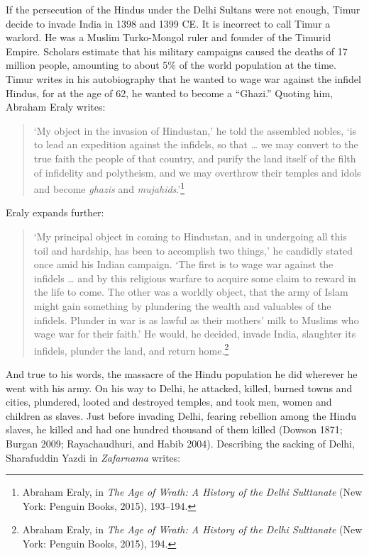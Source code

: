 If the persecution of the Hindus under the Delhi Sultans were not enough, Timur decide to invade India in 1398 and 1399 CE. It is incorrect to call Timur a warlord. He was a Muslim Turko-Mongol ruler and founder of the Timurid Empire. Scholars estimate that his military campaigns caused the deaths of 17 million people, amounting to about 5\% of the world population at the time. Timur writes in his autobiography that he wanted to wage war against the infidel Hindus, for at the age of 62, he wanted to become a “Ghazi.” Quoting him, Abraham Eraly writes: 
\begin{quote}
‘My object in the invasion of Hindustan,’ he told the assembled nobles, ‘is to lead an expedition against the infidels, so that … we may convert to the true faith the people of that country, and purify the land itself of the filth of infidelity and polytheism, and we may overthrow their temples and idols and become \textit{ghazis} and \textit{mujahids}.’\footnote{Abraham Eraly, in \textit{The Age of Wrath: A History of the Delhi Sulttanate} (New York: Penguin Books, 2015), 193--194.}
\end{quote}
Eraly expands further:
\begin{quote}
‘My principal object in coming to Hindustan, and in undergoing all this toil and hardship, has been to accomplish two things,’ he candidly stated once amid his Indian campaign. ‘The first is to wage war against the infidels … and by this religious warfare to acquire some claim to reward in the life to come. The other was a worldly object, that the army of Islam might gain something by plundering the wealth and valuables of the infidels. Plunder in war is as lawful as their mothers’ milk to Muslims who wage war for their faith.’ He would, he decided, invade India, slaughter its infidels, plunder the land, and return home.\footnote{Abraham Eraly, in \textit{The Age of Wrath: A History of the Delhi Sulttanate} (New York: Penguin Books, 2015), 194.}
\end{quote}
And true to his words, the massacre of the Hindu population he did wherever he went with his army. On his way to Delhi, he attacked, killed, burned towns and cities, plundered, looted and destroyed temples, and took men, women and children as slaves. Just before invading Delhi, fearing rebellion among the Hindu slaves, he killed and had one hundred thousand of them killed (Dowson 1871; Burgan 2009; Rayachaudhuri, and Habib 2004). Describing the sacking of Delhi, Sharafuddin Yazdi in \textit{Zafarnama} writes: 
